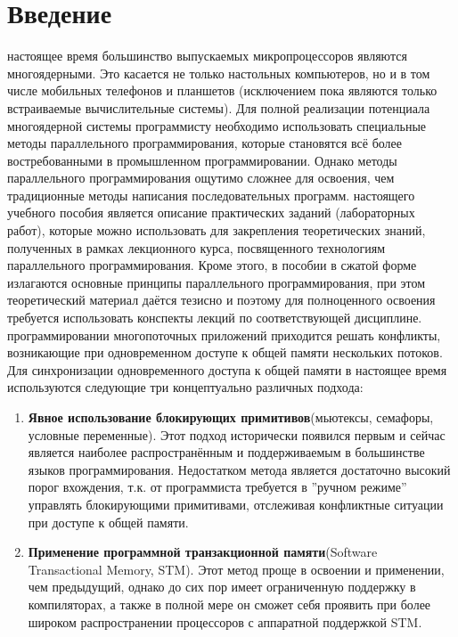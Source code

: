 { %
	\section*{Введение}
	 настоящее время большинство выпускаемых микропроцессоров являются многоядерными. Это касается не только настольных компьютеров, но и в том числе мобильных телефонов и планшетов (исключением пока являются только встраиваемые вычислительные системы). Для полной реализации потенциала многоядерной системы программисту необходимо использовать специальные методы параллельного программирования, которые становятся всё более востребованными в промышленном программировании. Однако методы параллельного программирования ощутимо сложнее для освоения, чем традиционные методы написания последовательных программ.
	 настоящего учебного пособия является описание практических заданий (лабораторных работ), которые можно использовать для закрепления теоретических знаний, полученных в рамках лекционного курса, посвященного технологиям параллельного программирования. Кроме этого, в пособии в сжатой форме излагаются основные принципы параллельного программирования, при этом теоретический материал даётся тезисно и поэтому для полноценного освоения требуется использовать конспекты лекций по соответствующей дисциплине.
	 программировании многопоточных приложений приходится решать конфликты, возникающие при одновременном доступе к общей памяти нескольких потоков. Для синхронизации одновременного доступа к общей памяти в настоящее время используются следующие три концептуально различных подхода:
	\begin{enumerate}
		\item\textbf{Явное использование блокирующих примитивов}\quad(мьютексы, семафоры, условные переменные). Этот подход исторически появился первым и сейчас является наиболее распространённым и поддерживаемым в большинстве языков программирования. Недостатком метода является достаточно высокий порог вхождения, т.к. от программиста требуется в ''ручном режиме'' управлять блокирующими примитивами, отслеживая конфликтные ситуации при доступе к общей памяти.
		\item\textbf{Применение программной транзакционной памяти}\quad(Software\\ Transactional Memory, STM). Этот метод проще в освоении и применении, чем предыдущий, однако до сих пор имеет ограниченную поддержку в компиляторах, а также в полной мере он сможет себя проявить при более широком распространении процессоров с аппаратной поддержкой STM.

\end{enumerate}}
